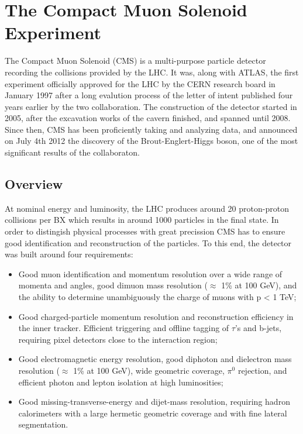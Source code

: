 \chapter{The Compact Muon Solenoid Experiment}
\label{chap:I-3-cms}

	The Compact Muon Solenoid (CMS) \cite{1748-0221-3-08-S08004} is a multi-purpose particle detector recording the collisions provided by the LHC. It was, along with ATLAS, the first experiment officially approved for the LHC by the CERN research board in January 1997 after a long evalution process of the letter of intent published four years earlier by the two collaboration. The construction of the detector started in 2005, after the excavation works of the cavern finished, and spanned until 2008. Since then, CMS has been proficiently taking and analyzing data, and announced on July 4th 2012 the discovery of the Brout-Englert-Higgs boson, one of the most significant results of the collaboraton.

  \section{Overview}

    At nominal energy and luminosity, the LHC produces around 20 proton-proton collisions per BX which results in around 1000 particles in the final state. In order to distingish physical processes with great precission CMS has to ensure good identification and reconstruction of the particles. To this end, the detector was built around four requirements:
    \begin{itemize}
      \item Good muon identification and momentum resolution over a wide range of momenta and angles, good dimuon mass resolution ($ \approx $ 1\% at 100 GeV), and the ability to determine unambiguously the charge of muons with p < 1 TeV;
      \item Good charged-particle momentum resolution and reconstruction efficiency in the inner tracker. Efficient triggering and offline tagging of $ \tau $'s and b-jets, requiring pixel detectors close to the interaction region;
      \item Good electromagnetic energy resolution, good diphoton and dielectron mass resolution ($ \approx $ 1\% at 100 GeV), wide geometric coverage, $ \pi^0 $ rejection, and efficient photon and lepton isolation at high luminosities;
      \item Good missing-transverse-energy and dijet-mass resolution, requiring hadron calorimeters with a large hermetic geometric coverage and with fine lateral segmentation. \\
    \end{itemize}

